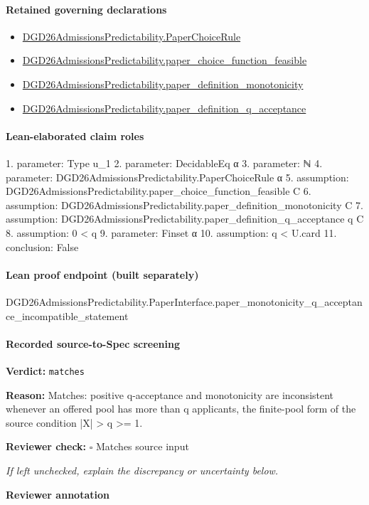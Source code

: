 \documentclass[10pt]{article}
\newcommand{\reviewerbox}{%
  \par\noindent\fbox{\parbox{0.96\linewidth}{\rule{0pt}{0.38in}}}\par
}
\newcommand{\reviewmatch}[1]{%
  \par\noindent\textbf{Reviewer check:} $\square$\; #1\par
  \noindent\emph{If left unchecked, explain the discrepancy or uncertainty below.}\par
}
\begin{document}
\paragraph{Retained governing declarations}
\begin{itemize}\raggedright
\item \hyperlink{governing-declaration-4678951b4432b184}{DGD26\allowbreak{}Admissions\allowbreak{}Predictability.\allowbreak{}Paper\allowbreak{}Choice\allowbreak{}Rule}
\item \hyperlink{governing-declaration-f7de74a44053f6d5}{DGD26\allowbreak{}Admissions\allowbreak{}Predictability.\allowbreak{}paper\_\allowbreak{}choice\_\allowbreak{}function\_\allowbreak{}feasible}
\item \hyperlink{governing-declaration-bac62f3daf5d4d98}{DGD26\allowbreak{}Admissions\allowbreak{}Predictability.\allowbreak{}paper\_\allowbreak{}definition\_\allowbreak{}monotonicity}
\item \hyperlink{governing-declaration-7ecd62274fb2f391}{DGD26\allowbreak{}Admissions\allowbreak{}Predictability.\allowbreak{}paper\_\allowbreak{}definition\_\allowbreak{}q\_\allowbreak{}acceptance}
\end{itemize}
\paragraph{Lean-elaborated claim roles}\begin{ReviewVerbatim}
1. parameter: Type u_1
2. parameter: DecidableEq α
3. parameter: ℕ
4. parameter: DGD26AdmissionsPredictability.PaperChoiceRule α
5. assumption: DGD26AdmissionsPredictability.paper_choice_function_feasible C
6. assumption: DGD26AdmissionsPredictability.paper_definition_monotonicity C
7. assumption: DGD26AdmissionsPredictability.paper_definition_q_acceptance q C
8. assumption: 0 < q
9. parameter: Finset α
10. assumption: q < U.card
11. conclusion: False
\end{ReviewVerbatim}

\paragraph{Lean proof endpoint (built separately)}\begin{ReviewVerbatim}
DGD26AdmissionsPredictability.PaperInterface.paper_monotonicity_q_acceptance_incompatible_statement
\end{ReviewVerbatim}

\paragraph{Recorded source-to-Spec screening}
\textbf{Verdict:} \texttt{matches}
\\
{\raggedright
\textbf{Reason:} Matches:\allowbreak{} positive q-\allowbreak{}acceptance and monotonicity are inconsistent whenever an offered pool has more than q applicants, the finite-\allowbreak{}pool form of the source condition |X| > q >= 1.\allowbreak{}
\par}
\reviewmatch{Matches source input}
\noindent\textbf{Reviewer annotation}\par
\reviewerbox
\clearpage
\hypertarget{source-claim-f926138cb2114337}{}
\end{document}
